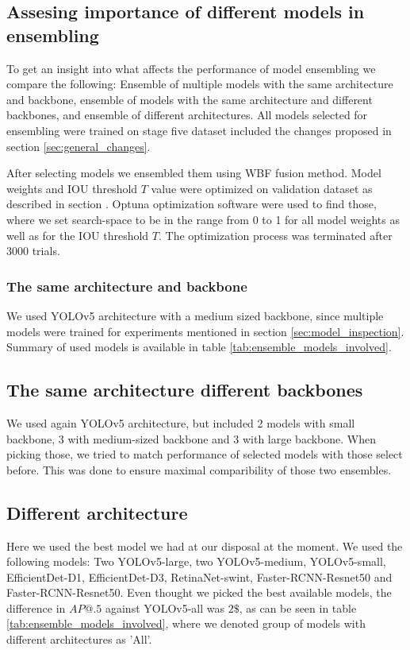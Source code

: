 \subsection{Assesing importance of different models in ensembling}
To get an insight into what affects the performance of model ensembling we compare the following: Ensemble of multiple models with the same architecture and backbone, ensemble of models with the same architecture and different backbones, and ensemble of different architectures. All models selected for ensembling were trained on stage five dataset included the changes proposed in section \ref{sec:general_changes}.

After selecting models we ensembled them using WBF fusion method. Model weights and IOU threshold $T$ value were optimized on validation dataset as described in section \cite{sec:ensembling}. Optuna optimization software were used to find those, where we set search-space to be in the range from 0 to 1 for all model weights as well as for the IOU threshold $T$. The optimization process was terminated after $3000$ trials.

\subsubsection{The same architecture and backbone}
We used YOLOv5 architecture with a medium sized backbone, since multiple models were trained for experiments mentioned in section \ref{sec:model_inspection}. Summary of used models is available in table \ref{tab:ensemble_models_involved}.

\subsection{The same architecture different backbones}
We used again YOLOv5 architecture, but included 2 models with small backbone, 3 with medium-sized backbone and 3 with large backbone. When picking those, we tried to match performance of selected models with those select before. This was done to ensure maximal comparibility of those two ensembles.

\subsection{Different architecture}
Here we used the best model we had at our disposal at the moment. We used the following models: Two YOLOv5-large, two YOLOv5-medium, YOLOv5-small, EfficientDet-D1, EfficientDet-D3, RetinaNet-swint, Faster-RCNN-Resnet50 and Faster-RCNN-Resnet50. Even thought we picked the best available models, the difference in $AP@.5$ against YOLOv5-all was $2\$$, as can be seen in table \ref{tab:ensemble_models_involved}, where we denoted group of models with different architectures as 'All'.

